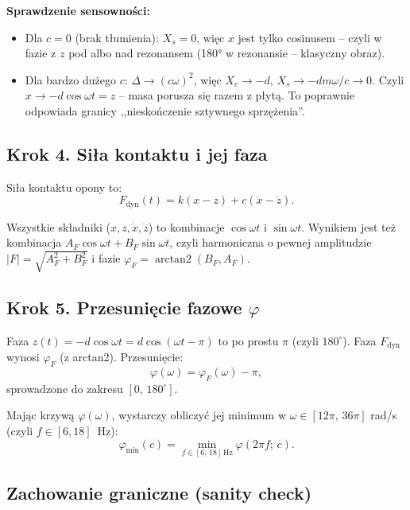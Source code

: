 \documentclass[11pt,a4paper]{article}
\DeclareMathOperator{\arctantwo}{arctan2}
\theoremstyle{plainpol}
\begin{document}
\textbf{Sprawdzenie sensowności:}
\begin{itemize}
  \item Dla $c=0$ (brak tłumienia): $X_s = 0$, więc $x$ jest tylko
    cosinusem -- czyli w fazie z $z$ pod albo nad rezonansem (180° w
    rezonansie -- klasyczny obraz).
  \item Dla bardzo dużego $c$: $\Delta \to (c\omega)^2$, więc
    $X_c \to -d$, $X_s \to -dm\omega/c \to 0$. Czyli $x \to -d\cos\omega t = z$
    -- masa porusza się razem z płytą. To poprawnie odpowiada granicy
    ,,nieskończenie sztywnego sprzężenia''.
\end{itemize}

\subsection{Krok 4. Siła kontaktu i jej faza}

Siła kontaktu opony to:
\begin{equation}
  F_{\mathrm{dyn}}(t) = k(x - z) + c(\dot{x} - \dot{z}).
\end{equation}

Wszystkie składniki ($x, z, \dot{x}, \dot{z}$) to kombinacje $\cos\omega t$
i $\sin\omega t$. Wynikiem jest też kombinacja $A_F\cos\omega t + B_F\sin\omega t$,
czyli harmoniczna o pewnej amplitudzie $|F| = \sqrt{A_F^2 + B_F^2}$ i
fazie $\varphi_F = \arctantwo(B_F, A_F)$.

\subsection{Krok 5. Przesunięcie fazowe $\varphi$}

Faza $z(t) = -d\cos\omega t = d\cos(\omega t - \pi)$ to po prostu $\pi$
(czyli $180^\circ$). Faza $F_{\mathrm{dyn}}$ wynosi $\varphi_F$
(z arctan2). Przesunięcie:
\begin{equation}
  \varphi(\omega) = \varphi_F(\omega) - \pi,
\end{equation}
sprowadzone do zakresu $[0,\,180^\circ]$.

Mając krzywą $\varphi(\omega)$, wystarczy obliczyć jej minimum w
$\omega \in [12\pi,\,36\pi]$ rad/s (czyli $f \in [6,18]$~Hz):
\begin{equation}
  \varphi_{\min}(c) = \min_{f\in[6,\,18]\,\mathrm{Hz}} \varphi(2\pi f;\,c).
\end{equation}

\subsection{Zachowanie graniczne (sanity check)}
\end{document}
